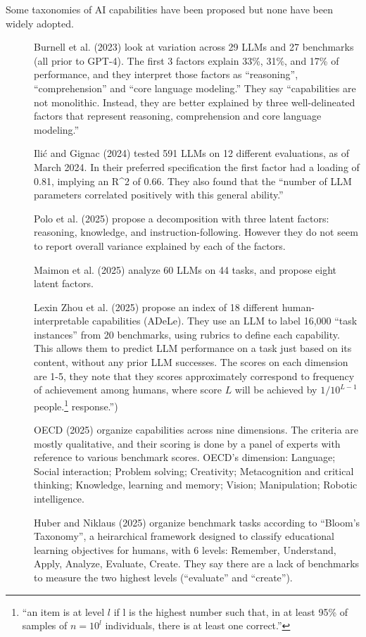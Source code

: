 \documentclass[
  letterpaper,
  DIV=11,
  numbers=noendperiod,
  oneside]{scrartcl}
\begin{document}
\begin{description}
\item[Some taxonomies of AI capabilities have been proposed but none
have been widely adopted.]
Burnell et al. (2023) look at variation across 29 LLMs and 27 benchmarks
(all prior to GPT-4). The first 3 factors explain 33\%, 31\%, and 17\%
of performance, and they interpret those factors as ``reasoning'',
``comprehension'' and ``core language modeling.'' They say
``capabilities are not monolithic. Instead, they are better explained by
three well-delineated factors that represent reasoning, comprehension
and core language modeling.''

Ilić and Gignac (2024) tested 591 LLMs on 12 different evaluations, as
of March 2024. In their preferred specification the first factor had a
loading of 0.81, implying an R\^{}2 of 0.66. They also found that the
``number of LLM parameters correlated positively with this general
ability.''

Polo et al. (2025) propose a decomposition with three latent factors:
reasoning, knowledge, and instruction-following. However they do not
seem to report overall variance explained by each of the factors.

Maimon et al. (2025) analyze 60 LLMs on 44 tasks, and propose eight
latent factors.

Lexin Zhou et al. (2025) propose an index of 18 different
human-interpretable capabilities (ADeLe). They use an LLM to label
16,000 ``task instances'' from 20 benchmarks, using rubrics to define
each capability. This allows them to predict LLM performance on a task
just based on its content, without any prior LLM successes. The scores
on each dimension are 1-5, they note that they scores approximately
correspond to frequency of achievement among humans, where score \(L\)
will be achieved by \(1/10^{L-1}\) people.\footnote{``an item is at
  level \(l\) if l is the highest number such that, in at least 95\% of
  samples of \(n = 10^l\) individuals, there is at least one correct.''}
response.'')

OECD (2025) organize capabilities across nine dimensions. The criteria
are mostly qualitative, and their scoring is done by a panel of experts
with reference to various benchmark scores. OECD's dimension: Language;
Social interaction; Problem solving; Creativity; Metacognition and
critical thinking; Knowledge, learning and memory; Vision; Manipulation;
Robotic intelligence.

Huber and Niklaus (2025) organize benchmark tasks according to ``Bloom's
Taxonomy'', a heirarchical framework designed to classify educational
learning objectives for humans, with 6 levels: Remember, Understand,
Apply, Analyze, Evaluate, Create. They say there are a lack of
benchmarks to measure the two highest levels (``evaluate'' and
``create'').


\end{description}
\end{document}
